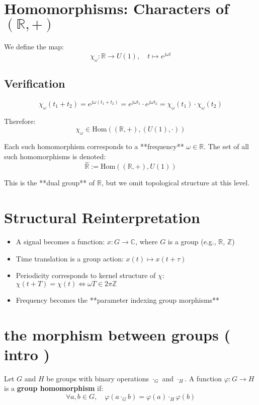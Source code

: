 \documentclass[12pt]{article}
\begin{document}
	\section{Homomorphisms: Characters of \((\mathbb{R}, +)\)}
	
	We define the map:
	\[
	\chi_\omega\colon \mathbb{R} \to U(1), \quad t \mapsto e^{j\omega t}
	\]
	
	\subsection*{Verification}
	
	\[
	\chi_\omega(t_1 + t_2) = e^{j\omega(t_1 + t_2)} = e^{j\omega t_1} \cdot e^{j\omega t_2} = \chi_\omega(t_1) \cdot \chi_\omega(t_2)
	\]
	
	Therefore:
	\[
	\chi_\omega \in \mathrm{Hom}((\mathbb{R}, +), (U(1), \cdot))
	\]
	
	Each such homomorphism corresponds to a **frequency** \( \omega \in \mathbb{R} \). The set of all such homomorphisms is denoted:
	\[
	\widehat{\mathbb{R}} := \mathrm{Hom}((\mathbb{R}, +), U(1))
	\]
	
	This is the **dual group** of \( \mathbb{R} \), but we omit topological structure at this level.
	
	\section{Structural Reinterpretation}
	
	\begin{itemize}[leftmargin=1.5em]
		\item A signal becomes a function: \( x \colon G \to \mathbb{C} \), where \( G \) is a group (e.g., \( \mathbb{R} \), \( \mathbb{Z} \))
		\item Time translation is a group action: \( x(t) \mapsto x(t + \tau) \)
		\item Periodicity corresponds to kernel structure of \( \chi \): \( \chi(t + T) = \chi(t) \iff \omega T \in 2\pi \mathbb{Z} \)
		\item Frequency becomes the **parameter indexing group morphisms**
	\end{itemize}
	
	\section{the morphism between groups ( intro )}
	Let \( G \) and \( H \) be groups with binary operations \( \cdot_G \) and \( \cdot_H \). A function \( \varphi \colon G \to H \) is a \textbf{group homomorphism} if:
	\[
	\forall a, b \in G,\quad \varphi(a \cdot_G b) = \varphi(a) \cdot_H \varphi(b)
	\]
	
\end{document}
